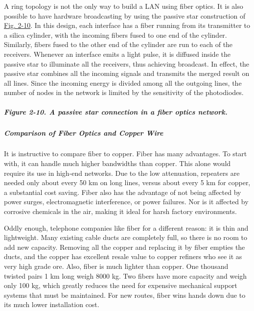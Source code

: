 \documentclass[b5paper,11pt]{memoir}
\begin{document}
A ring topology is not the only way to build a LAN using fiber optics.
It is also possible to have hardware broadcasting by using the {passive
star} construction of
\protect\hyperlink{0130661023_ch02lev1sec2.htmlux5cux23ch02fig10}{Fig.
2-10}. In this design, each interface has a fiber running from its
transmitter to a silica cylinder, with the incoming fibers fused to one
end of the cylinder. Similarly, fibers fused to the other end of the
cylinder are run to each of the receivers. Whenever an interface emits a
light pulse, it is diffused inside the passive star to illuminate all
the receivers, thus achieving broadcast. In effect, the passive star
combines all the incoming signals and transmits the merged result on all
lines. Since the incoming energy is divided among all the outgoing
lines, the number of nodes in the network is limited by the sensitivity
of the photodiodes.

\subparagraph[Figure 2-10. A passive star connection in a fiber optics
network.]{\texorpdfstring{\protect\hypertarget{0130661023_ch02lev1sec2.htmlux5cux23ch02fig10}{}{}Figure
2-10. A passive star connection in a fiber optics
network.}{Figure 2-10. A passive star connection in a fiber optics network.}}


\protect\hypertarget{0130661023_ch02lev1sec2.htmlux5cux23ch02lev3sec4}{}{}

\subparagraph{Comparison of Fiber Optics and Copper Wire}

It is instructive to compare fiber to copper. Fiber has many advantages.
To start with, it can handle much higher bandwidths than copper. This
alone would require its use in high-end networks. Due to the low
attenuation, repeaters are needed only about every 50 km on long lines,
versus about every 5 km for copper, a substantial cost saving. Fiber
also has the advantage of not being affected by power surges,
electromagnetic interference, or power failures. Nor is it affected by
corrosive chemicals in the air, making it ideal for harsh factory
environments.

Oddly enough, telephone companies like fiber for a different reason: it
is thin and lightweight. Many existing cable ducts are completely full,
so there is no room to add new capacity. Removing all the copper and
replacing it by fiber empties the ducts, and the copper has excellent
resale value to copper refiners who see it as very high grade ore. Also,
fiber is much lighter than copper. One thousand twisted pairs 1 km long
weigh 8000 kg. Two fibers have more capacity and weigh only 100 kg,
which greatly reduces the need for expensive mechanical support systems
that must be maintained. For new routes, fiber wins hands down due to
its much lower installation cost.
\end{document}
